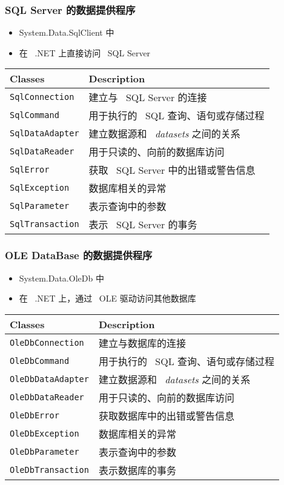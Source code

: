 \begin{frame}
\frametitle{SQL Server 的数据提供程序}

\begin{itemize}
\item System.Data.SqlClient 中
\item 在 ~.NET 上直接访问 ~SQL Server
\end{itemize}

  \begin{tabular}{l|l}
    \hline
    \textbf{Classes} & \textbf{Description} \\
    \hline
    \texttt{SqlConnection} & 建立与 ~SQL Server 的连接 \\
    \texttt{SqlCommand} & 用于执行的 ~SQL 查询、语句或存储过程 \\
    \texttt{SqlDataAdapter} & 建立数据源和 ~\textit{datasets} 之间的关系 \\
    \texttt{SqlDataReader} & 用于只读的、向前的数据库访问 \\
    \texttt{SqlError} & 获取 ~SQL Server 中的出错或警告信息 \\
    \texttt{SqlException} & 数据库相关的异常 \\
    \texttt{SqlParameter} & 表示查询中的参数 \\
    \texttt{SqlTransaction} & 表示 ~SQL Server 的事务 \\
    \hline
  \end{tabular}

\end{frame}

\begin{frame}
\frametitle{OLE DataBase 的数据提供程序}

\begin{itemize}
\item System.Data.OleDb 中
\item 在 ~.NET 上，通过 ~OLE 驱动访问其他数据库
\end{itemize}

  \begin{tabular}{l|l}
    \hline
    \textbf{Classes} & \textbf{Description} \\
    \hline
    \texttt{OleDbConnection} & 建立与数据库的连接 \\
    \texttt{OleDbCommand} & 用于执行的 ~SQL 查询、语句或存储过程 \\
    \texttt{OleDbDataAdapter} & 建立数据源和 ~\textit{datasets} 之间的关系 \\
    \texttt{OleDbDataReader} & 用于只读的、向前的数据库访问 \\
    \texttt{OleDbError} & 获取数据库中的出错或警告信息 \\
    \texttt{OleDbException} & 数据库相关的异常 \\
    \texttt{OleDbParameter} & 表示查询中的参数 \\
    \texttt{OleDbTransaction} & 表示数据库的事务 \\
    \hline
  \end{tabular}

\end{frame}

